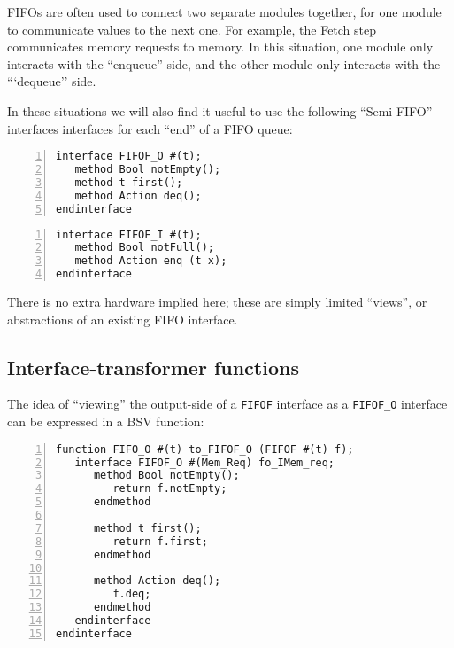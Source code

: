 FIFOs are often used to connect two separate modules together, for one
module to communicate values to the next one.  For example, the Fetch
step communicates memory requests to memory.  In this situation, one
module only interacts with the ``enqueue'' side, and the other module
only interacts with the ```dequeue'' side.

In these situations we will also find it useful to use the following
``Semi-FIFO'' interfaces interfaces for each ``end'' of a FIFO queue:


{\small
\begin{Verbatim}[frame=single, numbers=left]
interface FIFOF_O #(t);
   method Bool notEmpty();
   method t first();
   method Action deq();
endinterface
\end{Verbatim}
}


{\small
\begin{Verbatim}[frame=single, numbers=left]
interface FIFOF_I #(t);
   method Bool notFull();
   method Action enq (t x);
endinterface
\end{Verbatim}
}

There is no extra hardware implied here; these are simply limited
``views'', or abstractions of an existing FIFO interface.


\subsection{Interface-transformer functions}

\label{Sec_interface_transfomers}


The idea of ``viewing'' the output-side of a \verb|FIFOF| interface as
a \verb|FIFOF_O| interface can be expressed in a BSV function:

{\small
\begin{Verbatim}[frame=single, numbers=left]
function FIFO_O #(t) to_FIFOF_O (FIFOF #(t) f);
   interface FIFOF_O #(Mem_Req) fo_IMem_req;
      method Bool notEmpty();
         return f.notEmpty;
      endmethod

      method t first();
         return f.first;
      endmethod

      method Action deq();
         f.deq;
      endmethod
   endinterface
endinterface
\end{Verbatim}
}

